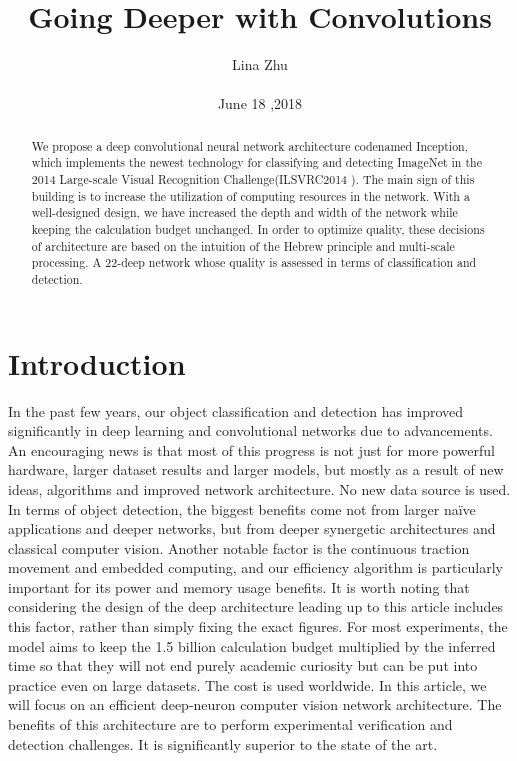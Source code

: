 \documentclass[10pt,twocolumn,letterpaper]{article}
\begin{document}
	\title{Going Deeper with Convolutions}
	\author{Lina Zhu\\\\June 18 ,2018}
\maketitle
\begin{abstract}
We propose a deep convolutional neural network architecture codenamed Inception, which implements the newest technology for classifying and detecting ImageNet in the 2014 Large-scale Visual Recognition Challenge(ILSVRC2014 ). The main sign of this building is to increase the utilization of computing resources in the network. With a well-designed design, we have increased the depth and width of the network while keeping the calculation budget unchanged. In order to optimize quality, these decisions of architecture are based on the intuition of the Hebrew principle and multi-scale processing. A 22-deep network whose quality is assessed in terms of classification and detection.
\end{abstract}
\section{Introduction}
In the past few years, our object classification and detection has improved significantly in deep learning and convolutional networks due to advancements\cite{LeCun_1989_Backpropagation}. An encouraging news is that most of this progress is not just for more powerful hardware, larger dataset results and larger models, but mostly as a result of new ideas, algorithms and improved network architecture. No new data source is used. In terms of object detection, the biggest benefits come not from larger naïve applications and deeper networks, but from deeper synergetic architectures and classical computer vision. Another notable factor is the continuous traction movement and embedded computing, and our efficiency algorithm is particularly important for its power and memory usage benefits. It is worth noting that considering the design of the deep architecture leading up to this article includes this factor, rather than simply fixing the exact figures. For most experiments, the model aims to keep the 1.5 billion calculation budget multiplied by the inferred time so that they will not end purely academic curiosity but can be put into practice even on large datasets. The cost is used worldwide. In this article, we will focus on an efficient deep-neuron computer vision network architecture. The benefits of this architecture are to perform experimental verification and detection challenges. It is significantly superior to the state of the art.
\end{document}
